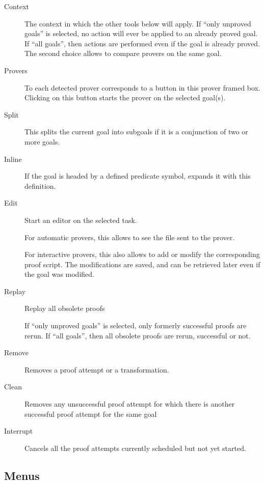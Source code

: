 \begin{description}
\item[Context] The context in which the other tools below will
  apply. If ``only unproved goals'' is selected, no action will ever
  be applied to an already proved goal.  If ``all goals'', then
  actions are performed even if the goal is already proved. The second
  choice allows to compare provers on the same goal.

\item[Provers] To each detected prover corresponds to a button in this
  prover framed box. Clicking on this button starts the prover on the
  selected goal(s).

\item[Split] This splits the current goal into subgoals if it is a
  conjunction of two or more goals.

\item[Inline] If the goal is headed by a defined predicate symbol,
  expands it with this definition.

\item[Edit] Start an editor on the selected task.

  For automatic provers, this allows to see the file sent to the
  prover.

  For interactive provers, this also allows to add or modify the
  corresponding proof script. The modifications are saved, and can be
  retrieved later even if the goal was modified.

\item[Replay] Replay all obsolete proofs

  If ``only unproved goals'' is selected, only formerly successful
  proofs are rerun. If ``all goals'', then all obsolete proofs are
  rerun, successful or not.

\item[Remove] Removes a proof attempt or a transformation.

\item[Clean] Removes any unsuccessful proof attempt for which there is
  another successful proof attempt for the same goal

\item[Interrupt] Cancels all the proof attempts currently scheduled
  but not yet started.

\end{description}

\subsection{Menus}

